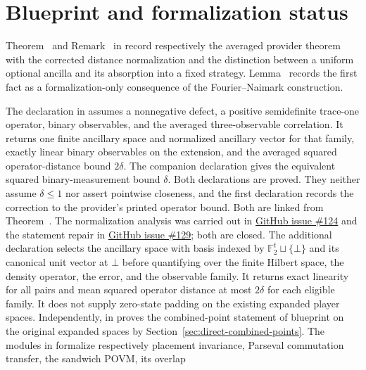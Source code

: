 \documentclass[11pt]{article}
\renewcommand{\ghissue}[1]{%
  \href{https://github.com/Dengnifer/MIPStarRE-QPBT/issues/#1}{GitHub issue \##1}}
\begin{document}
\section{Blueprint and formalization status}

Theorem~ and Remark~ in
 record respectively the
averaged provider theorem with the corrected distance normalization and the
distinction between a uniform optional ancilla and its absorption into a
fixed strategy. Lemma~ records the first
fact as a formalization-only consequence of the Fourier--Naimark construction.

The declaration  in
 assumes a nonnegative defect, a
positive semidefinite trace-one operator, binary observables, and the averaged
three-observable correlation.  It returns one finite ancillary space and
normalized ancillary vector for that family, exactly linear binary observables
on the extension, and the averaged squared operator-distance bound $2\delta$.
The companion declaration
 gives the
equivalent squared binary-measurement bound $\delta$.  Both declarations are
proved.  They neither assume $\delta\leq1$ nor assert pointwise closeness, and
the first declaration records the correction to the provider's printed
operator bound.  Both are linked from Theorem~.  The
normalization analysis was carried out in \ghissue{124} and the statement
repair in \ghissue{129}; both are closed. The additional declaration
 selects the ancillary
space with basis indexed by $\mathbb F_2^t\sqcup\{\bot\}$ and its canonical
unit vector at $\bot$ before quantifying over the finite Hilbert space, the
density operator, the error, and the observable family. It returns exact
linearity for all pairs and mean
squared operator distance at most $2\delta$ for each eligible family. It
does not supply zero-state padding on the existing expanded player spaces.
Independently,  in
 proves the combined-point statement
of blueprint  on the original expanded spaces by
Section~\ref{sec:direct-combined-points}.  The modules in
 formalize respectively placement
invariance, Parseval commutation transfer, the sandwich POVM, its overlap
\end{document}

